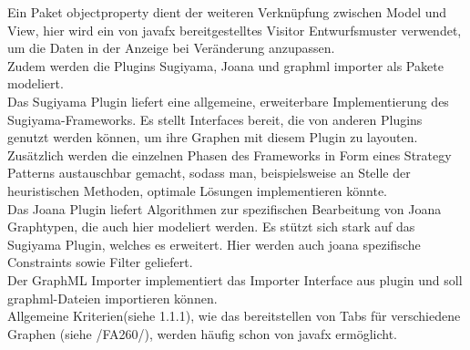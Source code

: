 Ein Paket objectproperty dient der weiteren Verknüpfung zwischen Model und View, hier wird ein von javafx bereitgestelltes Visitor Entwurfsmuster verwendet, um die Daten in der Anzeige bei Veränderung anzupassen.\\
Zudem werden die Plugins Sugiyama, Joana und graphml importer als Pakete modeliert.\\
Das Sugiyama Plugin liefert eine allgemeine, erweiterbare Implementierung des Sugiyama-Frameworks. Es stellt Interfaces bereit, die von anderen Plugins genutzt werden können, um ihre Graphen mit diesem Plugin zu layouten. Zusätzlich werden die einzelnen Phasen des Frameworks in Form eines Strategy Patterns austauschbar gemacht, sodass man, beispielsweise an Stelle der heuristischen Methoden, optimale Lösungen implementieren könnte.\\
Das Joana Plugin liefert Algorithmen zur spezifischen Bearbeitung von Joana Graphtypen, die auch hier modeliert werden. Es stützt sich stark auf das Sugiyama Plugin, welches es erweitert. Hier werden auch joana spezifische Constraints sowie Filter geliefert.\\
Der GraphML Importer implementiert das Importer Interface aus plugin und soll graphml-Dateien importieren können.\\
Allgemeine Kriterien(siehe 1.1.1), wie das bereitstellen von Tabs für verschiedene Graphen (siehe /FA260/), werden häufig schon von javafx ermöglicht.
